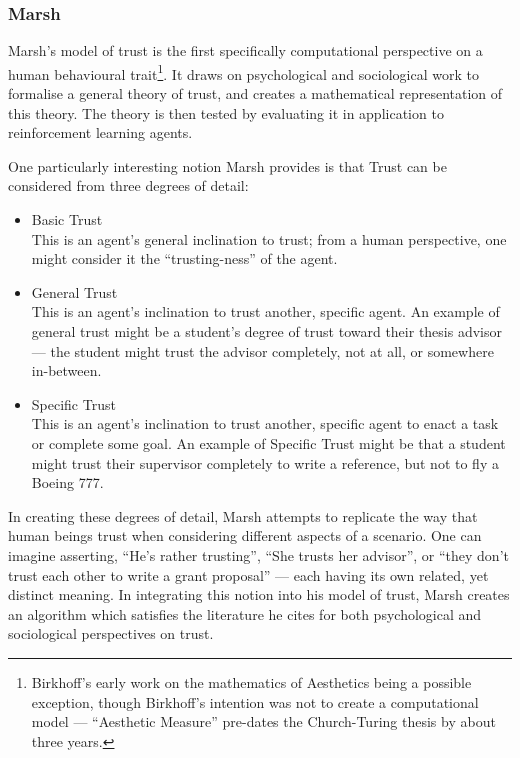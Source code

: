 \subsubsection*{Marsh}\label{sec:marsh}
Marsh's model of trust is the first specifically computational perspective on a human behavioural trait\footnote{Birkhoff's early work on the mathematics of Aesthetics\cite{Birkhoff1933} being a possible exception, though Birkhoff's intention was not to create a computational model --- ``Aesthetic Measure'' pre-dates the Church-Turing thesis by about three years.}. It draws on psychological and sociological work to formalise a general theory of trust, and creates a mathematical representation of this theory. The theory is then tested by evaluating it in application to reinforcement learning agents.\par

One particularly interesting notion Marsh provides is that Trust can be considered from three degrees of detail:
\begin{itemize}
    \item Basic Trust\\
        This is an agent's general inclination to trust; from a human perspective, one might consider it the ``trusting-ness'' of the agent.
    \item General Trust\\
        This is an agent's inclination to trust another, specific agent. An example of general trust might be a student's degree of trust toward their thesis advisor --- the student might trust the advisor completely, not at all, or somewhere in-between.
    \item Specific Trust\\
        This is an agent's inclination to trust another, specific agent to enact a task or complete some goal. An example of Specific Trust might be that a student might trust their supervisor completely to write a reference, but not to fly a Boeing 777.
\end{itemize}

In creating these degrees of detail, Marsh attempts to replicate the way that human beings trust when considering different aspects of a scenario. One can imagine asserting, ``He's rather trusting'', ``She trusts her advisor'', or ``they don't trust each other to write a grant proposal'' --- each having its own related, yet distinct meaning. In integrating this notion into his model of trust, Marsh creates an algorithm which satisfies the literature he cites for both psychological and sociological perspectives on trust.\par


